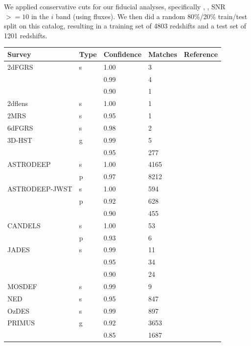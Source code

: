 We applied conservative cuts for our fiducial analyses, specifically , , SNR $>= 10$ in the $i$ band (using  fluxes).
We then did a random 80\%/20\% train/test split on this catalog, resulting in a training set of 4803 redshifts and a test set of 1201 redshifts.

\begin{table}[!p]
    \centering
    \begin{tabular}{lllll}
        \hline
        Survey & Type & Confidence & Matches& Reference \\
        \hline
        \hline
        2dFGRS & s & 1.00 & 3 & \citet{colless2001} \\
               &   & 0.99 & 4 & \\
               &   & 0.90 & 1 & \\
        2dflens & s & 1.00 & 1 & \citet{blake2016} \\
        2MRS & s & 0.95 & 1 & \citet{huchra2012} \\
        6dFGRS & s & 0.98 & 2 & \citet{jones2009} \\
        3D-HST & g & 0.99 & 5 & \citet{momcheva2016} \\
               &   & 0.95 & 277 & \\
        ASTRODEEP & s & 1.00 & 4165 & \citet{merlin2021} \\
                  & p & 0.97 & 8212 & \\
        ASTRODEEP-JWST & s & 1.00 & 594 & \citet{merlin2024} \\
                       & p & 0.92 & 628 & \\
                       &   & 0.90 & 455 & \\
        CANDELS & s & 1.00 & 53 & \citet{kodra2023} \\
                & p & 0.93 & 6 & \\
        JADES & s & 0.99 & 11 & \citet{deugenio2025} \\
              &   & 0.95 & 34 & \\
              &   & 0.90 & 24 & \\
        MOSDEF & s & 0.99 & 9 & \citet{kriek2015} \\
        NED & s & 0.95 & 847 & \citet{helou1991} \\
        OzDES & s & 0.99 & 897 & \citet{lidman2020} \\
        PRIMUS & g & 0.92 & 3653 & \citet{cool2013} \\
               &   & 0.85 & 1687 & \\

\end{tabular}
\end{table}
